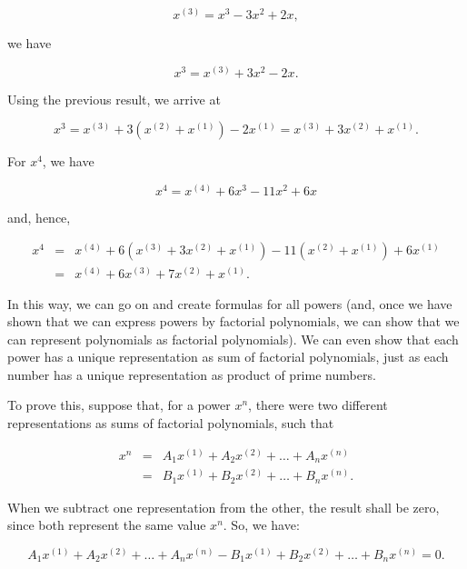 \documentclass[tikz]{scrreprt}
\begin{document}
\begin{equation}
x^{(3)} = x^3 - 3x^2 + 2x,
\end{equation}

we have

\begin{equation}
x^3 = x^{(3)} + 3x^2 - 2x.
\end{equation}

Using the previous result, we arrive at

\begin{equation}
x^3 = x^{(3)} + 3(x^{(2)} + x^{(1)}) - 2x^{(1)} =
      x^{(3)} + 3x^{(2)} + x^{(1)}.
\end{equation}

For $x^4$, we have

\begin{equation}
x^4 = x^{(4)} + 6x^3 - 11x^2 + 6x 
\end{equation}

and, hence,

\[
\begin{array}{lcl}
x^4 & = & x^{(4)} + 6(x^{(3)} + 3x^{(2)} + x^{(1)}) - 11(x^{(2)} + x^{(1)}) + 6x^{(1)} \\
    & = & x^{(4)} + 6x^{(3)} + 7x^{(2)} + x^{(1)}.
\end{array}
\]

In this way, we can go on and create formulas for all powers
(and, once we have shown that we can express powers by
factorial polynomials, we can show that we can represent
polynomials as factorial polynomials).
We can even show that each power has a unique representation
as sum of factorial polynomials, just as each number
has a unique representation as product of prime numbers.

To prove this, suppose that, for a power $x^n$,
there were two different representations as sums of
factorial polynomials, such that

\begin{equation}
\begin{array}{lcl}
x^n & = & A_1x^{(1)} + A_2x^{(2)} + \dots + A_nx^{(n)}\\
    & = & B_1x^{(1)} + B_2x^{(2)} + \dots + B_nx^{(n)}.
\end{array}
\end{equation}

When we subtract one representation from the other,
the result shall be zero, since both represent the
same value $x^n$. So, we have:

\begin{equation}
A_1x^{(1)} + A_2x^{(2)} + \dots + A_nx^{(n)} -
B_1x^{(1)} + B_2x^{(2)} + \dots + B_nx^{(n)} = 0.
\end{equation}
\end{document}
